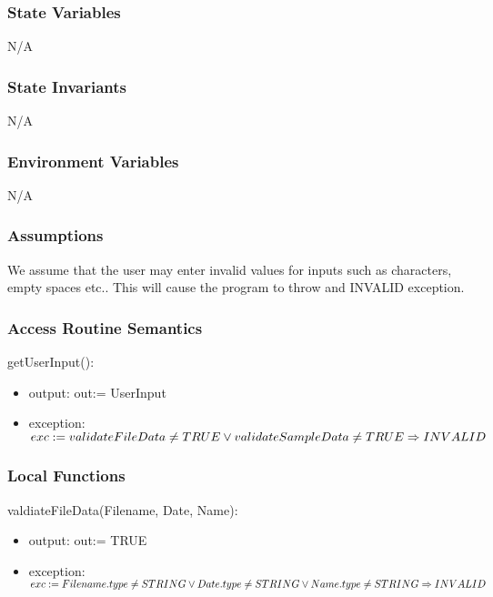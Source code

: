 \documentclass[12pt, titlepage]{article}
\begin{document}
\subsubsection{State Variables}
N/A

\subsubsection{State Invariants}
N/A

\subsubsection{Environment Variables}

N/A

\subsubsection{Assumptions}
We assume that the user may enter invalid values for inputs such as characters, empty spaces etc..
This will cause the program to throw and INVALID exception.

\subsubsection{Access Routine Semantics}

\noindent getUserInput():
\begin{itemize}
\item output: out:= UserInput
\item exception: $exc:= 
validateFileData \ne TRUE  \lor\\
validateSampleData \ne TRUE \\
\Rightarrow INVALID$
\end{itemize}


\subsubsection{Local Functions}
\noindent valdiateFileData(Filename, Date, Name):
\begin{itemize}
\item output: out:= TRUE
\item exception: $exc:= 
Filename.type \ne STRING \lor \\
Date.type \ne STRING  \lor \\
Name.type \ne STRING  \\
\Rightarrow INVALID$
\end{itemize}
\end{document}
